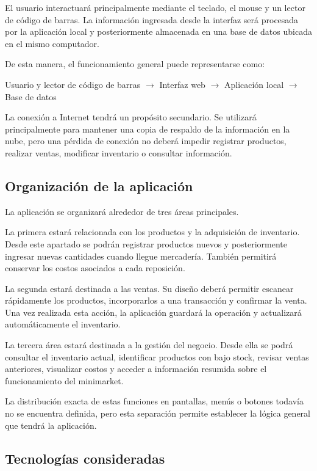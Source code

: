 \documentclass[10pt,a4paper]{article}
\begin{document}
El usuario interactuará principalmente mediante el teclado, el mouse y un lector de código de barras. La información ingresada desde la interfaz será procesada por la aplicación local y posteriormente almacenada en una base de datos ubicada en el mismo computador.

De esta manera, el funcionamiento general puede representarse como:

\begin{center}
Usuario y lector de código de barras
$\longrightarrow$
Interfaz web
$\longrightarrow$
Aplicación local
$\longrightarrow$
Base de datos
\end{center}

La conexión a Internet tendrá un propósito secundario. Se utilizará principalmente para mantener una copia de respaldo de la información en la nube, pero una pérdida de conexión no deberá impedir registrar productos, realizar ventas, modificar inventario o consultar información.


\subsection{Organización de la aplicación}

La aplicación se organizará alrededor de tres áreas principales.

La primera estará relacionada con los productos y la adquisición de inventario. Desde este apartado se podrán registrar productos nuevos y posteriormente ingresar nuevas cantidades cuando llegue mercadería. También permitirá conservar los costos asociados a cada reposición.

La segunda estará destinada a las ventas. Su diseño deberá permitir escanear rápidamente los productos, incorporarlos a una transacción y confirmar la venta. Una vez realizada esta acción, la aplicación guardará la operación y actualizará automáticamente el inventario.

La tercera área estará destinada a la gestión del negocio. Desde ella se podrá consultar el inventario actual, identificar productos con bajo stock, revisar ventas anteriores, visualizar costos y acceder a información resumida sobre el funcionamiento del minimarket.

La distribución exacta de estas funciones en pantallas, menús o botones todavía no se encuentra definida, pero esta separación permite establecer la lógica general que tendrá la aplicación.


\subsection{Tecnologías consideradas}
\end{document}
